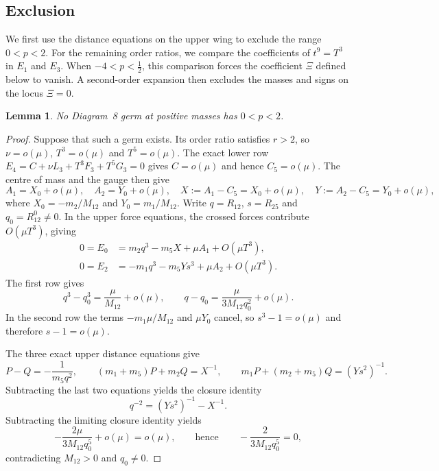 \documentclass[Threeside,11pt]{article}
\newtheorem{lemma}[theorem]{Lemma}
\theoremstyle{definition}
\theoremstyle{remark}
\numberwithin{equation}{section}
\theoremstyle{remark}
\begin{document}
\subsection{Exclusion}
{We first use the distance equations on the upper wing to exclude the range
$0<p<2$.  For the remaining order ratios, we compare the}
coefficients of $t^9=T^3$ in $E_1$ and $E_3$.  When $-4<p<\frac12$, this
comparison forces the coefficient $\Xi$ defined below to vanish.  A second-order
expansion then excludes the masses and signs on the locus $\Xi=0$.

{\begin{lemma}\label{lem:d8-order-six}
No Diagram~8 germ at positive masses has $0<p<2$.
\end{lemma}
\begin{proof}
Suppose that such a germ exists.  Its order ratio satisfies $r>2$, so
$\nu=o(\mu)$, $T^3=o(\mu)$ and $T^5=o(\mu)$.
The exact lower row $E_4=C+\nu L_3+T^3F_3+T^5G_3=0$ gives
$C=o(\mu)$ and hence $C_5=o(\mu)$.
The centre of mass and the gauge then give
\[
A_1=X_0+o(\mu),\quad A_2=Y_0+o(\mu),\quad
X:=A_1-C_5=X_0+o(\mu),\quad Y:=A_2-C_5=Y_0+o(\mu),
\]
where $X_0=-m_2/M_{12}$ and $Y_0=m_1/M_{12}$.
Write $q=R_{12}$, $s=R_{25}$ and $q_0=R_{12}^0\ne0$.
In the upper force equations, the crossed forces contribute
$O(\mu T^3)$, giving
\begin{align*}
0=E_0&=m_2q^3-m_5X+\mu A_1+O(\mu T^3),\\
0=E_2&=-m_1q^3-m_5Ys^3+\mu A_2+O(\mu T^3).
\end{align*}
The first row gives
\[
q^3-q_0^3=\frac{\mu}{M_{12}}+o(\mu),\qquad
q-q_0=\frac{\mu}{3M_{12}q_0^2}+o(\mu).
\]
In the second row the terms
$-m_1\mu/M_{12}$ and $\mu Y_0$ cancel, so
$s^3-1=o(\mu)$ and therefore $s-1=o(\mu)$.

The three exact upper distance equations give
\[
P-Q=-\frac1{m_5q^2},\qquad
(m_1+m_5)P+m_2Q=X^{-1},\qquad
m_1P+(m_2+m_5)Q=(Ys^2)^{-1}.
\]
Subtracting the last two equations yields the closure identity
\[
q^{-2}=(Ys^2)^{-1}-X^{-1}.
\]
Subtracting the limiting closure identity yields
\[
-\frac{2\mu}{3M_{12}q_0^5}+o(\mu)=o(\mu),
\qquad\text{hence}\qquad -\frac{2}{3M_{12}q_0^5}=0,
\]
contradicting $M_{12}>0$ and $q_0\ne0$.
\end{proof}

}
\end{document}
